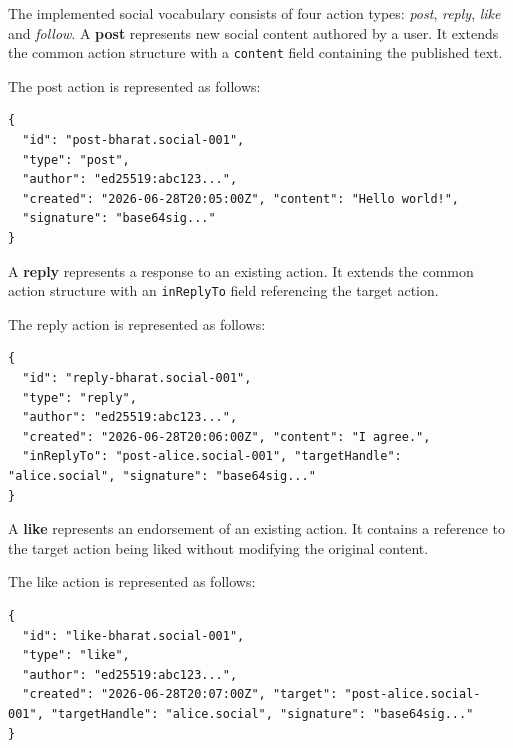 The implemented social vocabulary consists of four action types: \textit{post}, \textit{reply}, \textit{like} and \textit{follow}. A \textbf{post} represents new social content authored by a user. It extends the common action structure with a \texttt{content} field containing the published text. 

\begin{samepage}
The post action is represented as follows:
\begin{lstlisting}[caption={Example post action},label={lst:post_action}]
{ 
  "id": "post-bharat.social-001", 
  "type": "post", 
  "author": "ed25519:abc123...", 
  "created": "2026-06-28T20:05:00Z", "content": "Hello world!",
  "signature": "base64sig..." 
} 
\end{lstlisting}
\end{samepage}


A \textbf{reply} represents a response to an existing action. It extends the common action structure with an \texttt{inReplyTo} field referencing the target action. 

\begin{samepage}
The reply action is represented as follows:
\begin{lstlisting}[caption={Example reply action},label={lst:reply_action}]
{ 
  "id": "reply-bharat.social-001", 
  "type": "reply", 
  "author": "ed25519:abc123...", 
  "created": "2026-06-28T20:06:00Z", "content": "I agree.", 
  "inReplyTo": "post-alice.social-001", "targetHandle": "alice.social", "signature": "base64sig..." 
}
\end{lstlisting}
\end{samepage}

A \textbf{like} represents an endorsement of an existing action. It contains a reference to the target action being liked without modifying the original content. 

\begin{samepage}
The like action is represented as follows:
\begin{lstlisting}[caption={Example like action},label={lst:like_action}]
{ 
  "id": "like-bharat.social-001", 
  "type": "like", 
  "author": "ed25519:abc123...", 
  "created": "2026-06-28T20:07:00Z", "target": "post-alice.social-001", "targetHandle": "alice.social", "signature": "base64sig..."
}
\end{lstlisting}
\end{samepage}


